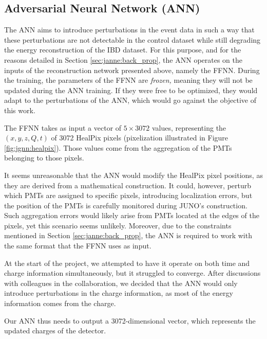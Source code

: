 \documentclass[../main.tex]{subfiles}
\begin{document}
\subsection{Adversarial Neural Network (ANN)}
\label{sec:janne:arch:ann}

The ANN aims to introduce perturbations in the event data in such a way that these perturbations are not detectable in the control dataset while still degrading the energy reconstruction of the IBD dataset. For this purpose, and for the reasons detailed in Section \ref{sec:janne:back_prop}, the ANN operates on the inputs of the reconstruction network presented above, namely the FFNN. During the training, the parameters of the FFNN are \textit{frozen,} meaning they will not be updated during the ANN training. If they were free to be optimized, they would adapt to the perturbations of the ANN, which would go against the objective of this work.

The FFNN takes as input a vector of $5 \times 3072$ values, representing the $(x,y,z,Q,t)$ of 3072 HealPix pixels (pixelization illustrated in Figure \ref{fig:jgnn:healpix}). Those values come from the aggregation of the PMTs belonging to those pixels.

It seems unreasonable that the ANN would modify the HealPix pixel positions, as they are derived from a mathematical construction. It could, however, perturb which PMTs are assigned to specific pixels, introducing localization errors, but the position of the PMTs is carefully monitored during JUNO's construction. Such aggregation errors would likely arise from PMTs located at the edges of the pixels, yet this scenario seems unlikely. Moreover, due to the constraints mentioned in Section \ref{sec:janne:back_prop}, the ANN is required to work with the same format that the FFNN uses as input.


At the start of the project, we attempted to have it operate on both time and charge information simultaneously, but it struggled to converge. After discussions with colleagues in the collaboration, we decided that the ANN would only introduce perturbations in the charge information, as most of the energy information comes from the charge.

Our ANN thus needs to output a 3072-dimensional vector, which represents the updated charges of the detector.
\end{document}
